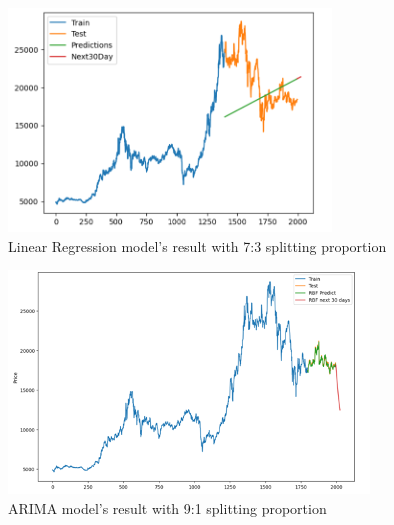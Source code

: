 \documentclass{ieeeojies}
\begin{document}
\begin{figure}[H]
  \centering
  \begin{minipage}{0.8\linewidth}
    \centering
    \includegraphics[width=\linewidth]{bibliography/LN_MBB73.png}
    \caption{Linear Regression model's result with 7:3 splitting proportion}
    \label{fig15}
  \end{minipage}
\end{figure}
\begin{figure}[H]
  \centering
  \begin{minipage}{0.8\linewidth}
    \centering
    \includegraphics[width=\linewidth]{bibliography/SVR_MBB91.png}
    \caption{ARIMA model's result with 9:1 splitting proportion}
    \label{fig16}
  \end{minipage}
\end{figure}
\end{document}
